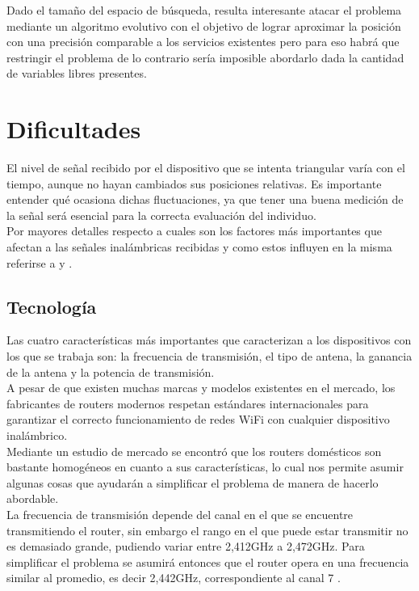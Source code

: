\documentclass[journal]{IEEEtran}
\begin{document}
Dado el tamaño del espacio de búsqueda, resulta interesante atacar el problema mediante un algoritmo evolutivo con el objetivo de lograr aproximar la posición con una precisión comparable a los servicios existentes pero para eso habrá que restringir el problema de lo contrario sería imposible abordarlo dada la cantidad de variables libres presentes.\\

\section{Dificultades}

El nivel de señal recibido por el dispositivo que se intenta triangular varía con el tiempo, aunque no hayan cambiados sus posiciones relativas. Es importante entender qué ocasiona dichas fluctuaciones, ya que tener una buena medición de la señal será esencial para la correcta evaluación del individuo.\\

Por mayores detalles respecto a cuales son los factores más importantes que afectan a las señales inalámbricas recibidas y como estos influyen en la misma referirse a \cite{fuzzy:logic:based:system} y \cite{radar:tracking:system}.\\

\subsection{Tecnología}

Las cuatro características más importantes que caracterizan a los dispositivos con los que se trabaja son: la frecuencia de transmisión, el tipo de antena, la ganancia de la antena y la potencia de transmisión.\\

A pesar de que existen muchas marcas y modelos existentes en el mercado, los fabricantes de routers modernos respetan estándares internacionales para garantizar el correcto funcionamiento de redes WiFi con cualquier dispositivo inalámbrico.\\

Mediante un estudio de mercado se encontró que los routers domésticos son bastante homogéneos en cuanto a sus características, lo cual nos permite asumir algunas cosas que ayudarán a simplificar el problema de manera de hacerlo abordable.\\

La frecuencia de transmisión depende del canal en el que se encuentre transmitiendo el router, sin embargo el rango en el que puede estar transmitir no es demasiado grande, pudiendo variar entre 2,412GHz a 2,472GHz. Para simplificar el problema se asumirá entonces que el router opera en una frecuencia similar al promedio, es decir 2,442GHz, correspondiente al canal 7 \cite{wifi:channels}.\\
\end{document}
